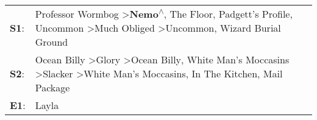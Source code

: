 \begin{supertabular}{p{0.03\textwidth}p{0.92\textwidth}}
 \textbf{S1}:  &    Professor Wormbog\textsuperscript{} \textgreater \enspace \textbf{Nemo\textsuperscript{$\wedge$}}, \enspace The Floor\textsuperscript{}, \enspace Padgett's Profile\textsuperscript{}, \enspace Uncommon\textsuperscript{} \textgreater \enspace Much Obliged\textsuperscript{} \textgreater \enspace Uncommon\textsuperscript{}, \enspace Wizard Burial Ground\textsuperscript{}  \enspace  \\
 \textbf{S2}:  &  Ocean Billy\textsuperscript{} \textgreater \enspace Glory\textsuperscript{} \textgreater \enspace Ocean Billy\textsuperscript{}, \enspace White Man's Moccasins\textsuperscript{} \textgreater \enspace Slacker\textsuperscript{} \textgreater \enspace White Man's Moccasins\textsuperscript{}, \enspace In The Kitchen\textsuperscript{}, \enspace Mail Package\textsuperscript{}  \enspace  \\
 \textbf{E1}:  &                                                                                                                                                                                                                                                                                                                                                              Layla\textsuperscript{}  \enspace  \\
\end{supertabular}
